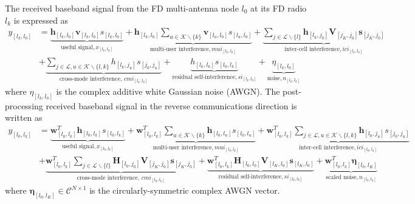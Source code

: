 \documentclass[onecolumn]{IEEEtran}
\begin{document}
The received baseband signal from the FD multi-antenna node $l_{0}$ at its FD radio $l_{k}$ is expressed as
\begin{align}
y_{[l_{k},l_{0}]} & = \underbrace{ \boldsymbol{h}_{[l_{k},l_{0}]} \boldsymbol{v}_{[l_{k},l_{0}]} s_{[l_{k},l_{0}]}}_{\text{useful signal}, x_{[l_{k},l_{0}]}} + \underbrace{ \boldsymbol{h}_{[l_{k},l_{0}]} \sum_{u \in \mathcal{K} \backslash \{ k \}} \boldsymbol{v}_{[l_{u},l_{0}]} s_{[l_{u},l_{0}]}}_{\text{multi-user interference}, mui_{[l_{k},l_{0}]}} + \underbrace{\sum_{j \in \mathcal{L} \backslash \{ l \}} \boldsymbol{h}_{[l_{k},j_{0}]} \boldsymbol{V}_{[j_{K},j_{0}]} \boldsymbol{s}_{[j_{K},j_{0}]} }_{\text{inter-cell interference}, ici_{[l_{k},l_{0}]}} \nonumber \\ & + \underbrace{\sum_{j \in \mathcal{L}, u \in \mathcal{K} \backslash \{ l,k \}} h_{[l_{k},j_{u}]} s_{[j_{0},j_{u}]} }_{\text{cross-mode interference}, \, cmi_{[l_{k},l_{0}]}} + \underbrace{ h_{[l_{k},l_{k}]} s_{[l_{0},l_{k}]} }_{\text{residual self-interference}, si_{[l_{k},l_{0}]}} + \underbrace{\eta_{[l_{k},l_{0}]}}_{\text{noise}, n_{[l_{k},l_{0}]}}
\label{eq:baseband-d}
\end{align}
where $\eta_{[l_{k},l_{0}]}$ is the complex additive white Gaussian noise (AWGN). The post-processing received baseband signal in the reverse communications direction is written as
\begin{align}
y_{[l_{0},l_{k}]} & = \underbrace{ \boldsymbol{w}^{T}_{[l_{0},l_{k}]}  \boldsymbol{h}_{[l_{0},l_{k}]} s_{[l_{0},l_{k}]}}_{\text{useful signal}, x_{[l_{0},l_{k}]}} + \underbrace{ \boldsymbol{w}^{T}_{[l_{0},l_{k}]} \sum_{u \in \mathcal{K} \backslash \{ k \}} \boldsymbol{h}_{[l_{0},l_{u}]} s_{[l_{0},l_{u}]} }_{\text{multi-user interference}, mui_{[l_{0},l_{k}]}} + \underbrace{ \boldsymbol{w}^{T}_{[l_{0},l_{k}]} \sum_{j \in \mathcal{L},u \in \mathcal{K} \backslash \{ l , k \}} \boldsymbol{h}_{[l_{0},j_{u}]} s_{[j_{0},j_{u}]} }_{\text{inter-cell interference}, ici_{[l_{0},l_{k}]}} \nonumber \\ & + \underbrace{ \boldsymbol{w}^{T}_{[l_{0},l_{k}]} \sum_{j \in \mathcal{L} \backslash \{ l \}}  \boldsymbol{H}_{[l_{0},j_{0}]} \boldsymbol{V}_{[j_{K},j_{0}]} \boldsymbol{s}_{[j_{K},j_{0}]} }_{\text{cross-mode interference}, \, cmi_{[l_{0},l_{k}]}} + \underbrace{ \boldsymbol{w}^{T}_{[l_{0},l_{k}]}  \boldsymbol{H}_{[l_{0},l_{0}]} \boldsymbol{V}_{[l_{K},l_{0}]} \boldsymbol{s}_{[l_{K},l_{0}]} }_{\text{residual self-interference}, si_{[l_{0},l_{k}]}} + \underbrace{\boldsymbol{w}^{T}_{[l_{0},l_{k}]} \boldsymbol{\eta}_{[l_{0},l_{K}]}}_{\text{scaled noise}, n_{[l_{0},l_{k}]}}
\label{eq:baseband-u}
\end{align}
where $\boldsymbol{\eta}_{[l_{0},l_{K}]} \in \mathcal{C}^{N \times 1}$ is the circularly-symmetric complex AWGN vector.
\end{document}
